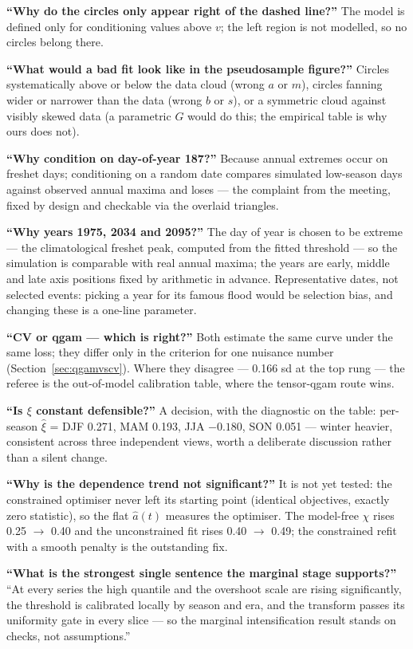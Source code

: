 \documentclass[11pt]{article}
\begin{document}
\textbf{``Why do the circles only appear right of the dashed line?''} The
model is defined only for conditioning values above $v$; the left region is
not modelled, so no circles belong there.

\textbf{``What would a bad fit look like in the pseudosample figure?''}
Circles systematically above or below the data cloud (wrong $a$ or $m$),
circles fanning wider or narrower than the data (wrong $b$ or $s$), or a
symmetric cloud against visibly skewed data (a parametric $G$ would do this;
the empirical table is why ours does not).

\textbf{``Why condition on day-of-year 187?''} Because annual extremes occur
on freshet days; conditioning on a random date compares simulated low-season
days against observed annual maxima and loses --- the complaint from the
meeting, fixed by design and checkable via the overlaid triangles.

\textbf{``Why years 1975, 2034 and 2095?''} The day of year is chosen to
be extreme --- the climatological freshet peak, computed from the fitted
threshold --- so the simulation is comparable with real annual maxima; the
years are early, middle and late axis positions fixed by arithmetic in
advance. Representative dates, not selected events: picking a year for its
famous flood would be selection bias, and changing these is a one-line
parameter.

\textbf{``CV or qgam --- which is right?''} Both estimate the same curve
under the same loss; they differ only in the criterion for one nuisance
number (Section~\ref{sec:qgamvscv}). Where they disagree --- 0.166 sd at
the top rung --- the referee is the out-of-model calibration table, where
the tensor-qgam route wins.

\textbf{``Is $\xi$ constant defensible?''} A decision, with the diagnostic on
the table: per-season $\hat\xi$ = DJF 0.271, MAM 0.193, JJA $-0.180$, SON
0.051 --- winter heavier, consistent across three independent views, worth a
deliberate discussion rather than a silent change.

\textbf{``Why is the dependence trend not significant?''} It is not yet
tested: the constrained optimiser never left its starting point (identical
objectives, exactly zero statistic), so the flat $\hat a(t)$ measures the
optimiser. The model-free $\chi$ rises 0.25 $\to$ 0.40 and the unconstrained
fit rises 0.40 $\to$ 0.49; the constrained refit with a smooth penalty is the
outstanding fix.

\textbf{``What is the strongest single sentence the marginal stage
supports?''} ``At every series the high quantile and the overshoot scale are
rising significantly, the threshold is calibrated locally by season and era,
and the transform passes its uniformity gate in every slice --- so the
marginal intensification result stands on checks, not assumptions.''
\end{document}
